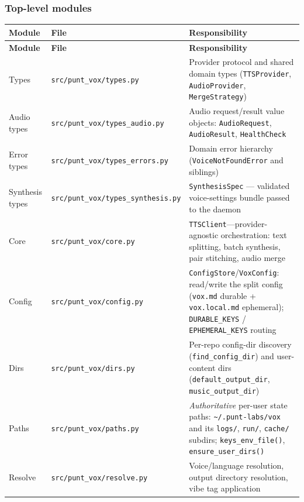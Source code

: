 \documentclass[a4paper,10pt]{article}
\newcommand{\modpath}[1]{\texttt{src/punt\_vox/#1}}
\begin{document}
\subsubsection*{Top-level modules}

\begin{center}
\begin{longtable}{llp{6.2cm}}
\toprule
\textbf{Module} & \textbf{File} & \textbf{Responsibility} \\
\midrule
\endfirsthead
\toprule
\textbf{Module} & \textbf{File} & \textbf{Responsibility} \\
\midrule
\endhead
Types      & \modpath{types.py}      & Provider protocol and shared
             domain types (\texttt{TTSProvider}, \texttt{AudioProvider},
             \texttt{MergeStrategy}) \\
Audio types & \modpath{types\_audio.py} & Audio request/result value
             objects: \texttt{AudioRequest}, \texttt{AudioResult},
             \texttt{HealthCheck} \\
Error types & \modpath{types\_errors.py} & Domain error hierarchy
             (\texttt{VoiceNotFoundError} and siblings) \\
Synthesis types & \modpath{types\_synthesis.py} & \texttt{SynthesisSpec}
             --- validated voice-settings bundle passed to the daemon \\
Core       & \modpath{core.py}       & \texttt{TTSClient}---provider-agnostic
             orchestration: text splitting, batch synthesis, pair
             stitching, audio merge \\
Config     & \modpath{config.py}     & \texttt{ConfigStore}/\texttt{VoxConfig}:
             read/write the split config (\texttt{vox.md} durable +
             \texttt{vox.local.md} ephemeral); \texttt{DURABLE\_KEYS} /
             \texttt{EPHEMERAL\_KEYS} routing \\
Dirs       & \modpath{dirs.py}       & Per-repo config-dir discovery
             (\texttt{find\_config\_dir}) and user-content dirs
             (\texttt{default\_output\_dir}, \texttt{music\_output\_dir}) \\
Paths      & \modpath{paths.py}      & \emph{Authoritative} per-user
             state paths: \texttt{\~{}/.punt-labs/vox} and its
             \texttt{logs/}, \texttt{run/}, \texttt{cache/} subdirs;
             \texttt{keys\_env\_file()}, \texttt{ensure\_user\_dirs()} \\
Resolve    & \modpath{resolve.py}    & Voice/language resolution, output
             directory resolution, vibe tag application \\

\end{longtable}
\end{center}
\end{document}
